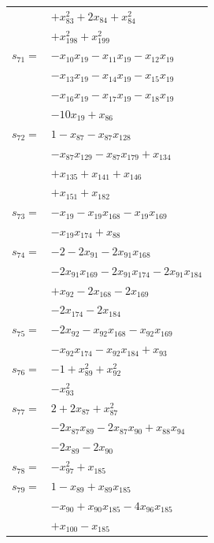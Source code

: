\begin{longtable}{@{}r@{\;}l@{}}
 & \(\displaystyle +x_{83}^{2} +2x_{84} +x_{84}^{2}\) \\
 & \(\displaystyle +x_{198}^{2} +x_{199}^{2}\) \\[3pt]
\(s_{71}=\) & \(\displaystyle -x_{10}x_{19} -x_{11}x_{19} -x_{12}x_{19}\) \\
 & \(\displaystyle -x_{13}x_{19} -x_{14}x_{19} -x_{15}x_{19}\) \\
 & \(\displaystyle -x_{16}x_{19} -x_{17}x_{19} -x_{18}x_{19}\) \\
 & \(\displaystyle -10x_{19} +x_{86}\) \\[3pt]
\(s_{72}=\) & \(\displaystyle 1 -x_{87} -x_{87}x_{128}\) \\
 & \(\displaystyle -x_{87}x_{129} -x_{87}x_{179} +x_{134}\) \\
 & \(\displaystyle +x_{135} +x_{141} +x_{146}\) \\
 & \(\displaystyle +x_{151} +x_{182}\) \\[3pt]
\(s_{73}=\) & \(\displaystyle -x_{19} -x_{19}x_{168} -x_{19}x_{169}\) \\
 & \(\displaystyle -x_{19}x_{174} +x_{88}\) \\[3pt]
\(s_{74}=\) & \(\displaystyle -2 -2x_{91} -2x_{91}x_{168}\) \\
 & \(\displaystyle -2x_{91}x_{169} -2x_{91}x_{174} -2x_{91}x_{184}\) \\
 & \(\displaystyle +x_{92} -2x_{168} -2x_{169}\) \\
 & \(\displaystyle -2x_{174} -2x_{184}\) \\[3pt]
\(s_{75}=\) & \(\displaystyle -2x_{92} -x_{92}x_{168} -x_{92}x_{169}\) \\
 & \(\displaystyle -x_{92}x_{174} -x_{92}x_{184} +x_{93}\) \\[3pt]
\(s_{76}=\) & \(\displaystyle -1 +x_{89}^{2} +x_{92}^{2}\) \\
 & \(\displaystyle -x_{93}^{2}\) \\[3pt]
\(s_{77}=\) & \(\displaystyle 2 +2x_{87} +x_{87}^{2}\) \\
 & \(\displaystyle -2x_{87}x_{89} -2x_{87}x_{90} +x_{88}x_{94}\) \\
 & \(\displaystyle -2x_{89} -2x_{90}\) \\[3pt]
\(s_{78}=\) & \(\displaystyle -x_{97}^{2} +x_{185}\) \\[3pt]
\(s_{79}=\) & \(\displaystyle 1 -x_{89} +x_{89}x_{185}\) \\
 & \(\displaystyle -x_{90} +x_{90}x_{185} -4x_{96}x_{185}\) \\
 & \(\displaystyle +x_{100} -x_{185}\) \\[3pt]

\end{longtable}
